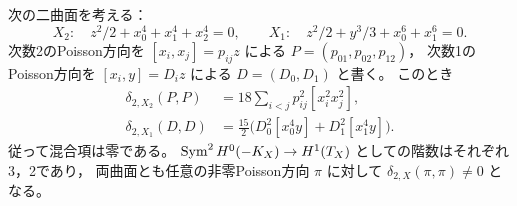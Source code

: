 \begin{proposition}[Fermat曲面の二次差]
\label{prop:ku-fermat-full-quadratic-tensor}
次の二曲面を考える：
\[
 X_2:\quad z^2/2+x_0^4+x_1^4+x_2^4=0,
 \qquad
 X_1:\quad z^2/2+y^3/3+x_0^6+x_1^6=0.
\]
次数2のPoisson方向を $[x_i,x_j]=p_{ij}z$ による $P=(p_{01},p_{02},p_{12})$，
次数1のPoisson方向を $[x_i,y]=D_i z$ による $D=(D_0,D_1)$ と書く。
このとき
\begin{align}
 \delta_{2,X_2}(P,P)
   &=18\sum_{i<j}p_{ij}^2[x_i^2x_j^2],
       \label{eq:ku-fermat-degree-two-tensor}\\
 \delta_{2,X_1}(D,D)
   &=\frac{15}{2}\bigl(D_0^2[x_0^4y]+D_1^2[x_1^4y]\bigr).
       \label{eq:ku-fermat-degree-one-tensor}
\end{align}
従って混合項は零である。
$\operatorname{Sym}^2H^0(-K_X)\to H^1(T_X)$ としての階数はそれぞれ3，2であり，
両曲面とも任意の非零Poisson方向 $\pi$ に対して
$\delta_{2,X}(\pi,\pi)\ne0$ となる。
\end{proposition}
